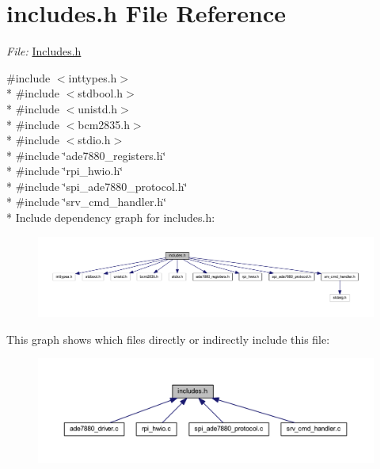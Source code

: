 \hypertarget{a00037}{\section{includes.\-h File Reference}
\label{d1/dc6/a00037}
}


{\itshape File\-:} \hyperlink{a00037}{Includes.\-h} \par
  


{\ttfamily \#include $<$inttypes.\-h$>$}\\*
{\ttfamily \#include $<$stdbool.\-h$>$}\\*
{\ttfamily \#include $<$unistd.\-h$>$}\\*
{\ttfamily \#include $<$bcm2835.\-h$>$}\\*
{\ttfamily \#include $<$stdio.\-h$>$}\\*
{\ttfamily \#include \char`\"{}ade7880\-\_\-registers.\-h\char`\"{}}\\*
{\ttfamily \#include \char`\"{}rpi\-\_\-hwio.\-h\char`\"{}}\\*
{\ttfamily \#include \char`\"{}spi\-\_\-ade7880\-\_\-protocol.\-h\char`\"{}}\\*
{\ttfamily \#include \char`\"{}srv\-\_\-cmd\-\_\-handler.\-h\char`\"{}}\\*
Include dependency graph for includes.\-h\-:\nopagebreak
\begin{figure}[H]
\begin{center}
\leavevmode
\includegraphics[width=350pt]{d6/d2d/a00047}
\end{center}
\end{figure}
This graph shows which files directly or indirectly include this file\-:\nopagebreak
\begin{figure}[H]
\begin{center}
\leavevmode
\includegraphics[width=350pt]{d4/dca/a00048}
\end{center}
\end{figure}
